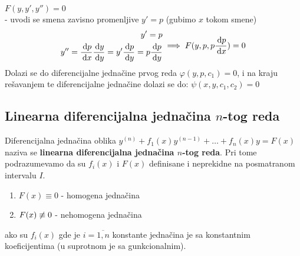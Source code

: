 \begin{enumerate}[label = \textbf{\arabic*. slučaj}]
		$ F(y, y', y'') = 0 $\\
		- uvodi se smena zavisno promenljive $ y' = p $ (gubimo $ x $ tokom smene)\\
		\begin{align*}
		\begin{aligned}
		y' = p\\
		y'' = \frac{\, \mathrm{d} p}{\, \mathrm{d} x} \frac{\, \mathrm{d} y}{\, \mathrm{d} y} = y' \frac{\, \mathrm{d} p}{\, \mathrm{d} y} = p \frac{\, \mathrm{d} p}{\, \mathrm{d} y}\\
		\end{aligned}
		\implies F(y, p, p \frac{\, \mathrm{d} p}{\, \mathrm{d} x}) = 0
		\end{align*}
		Dolazi se do diferencijalne jednačine prvog reda $ \varphi (y, p, c_1) = 0 $, i na kraju rešavanjem te diferencijalne jednačine dolazi se do: $\psi (x, y, c_1, c_2) = 0$
\end{enumerate}

\subsection{Linearna diferencijalna jednačina $n$-tog reda}
\begin{definition}
	Diferencijalna jednačina oblika $y^{(n)} + f_1(x)y^{(n-1)} + \ldots + f_n(x)y = F(x)$ naziva se \textbf{linearna diferencijalna jednačina $n$-tog reda}. Pri tome podrazumevamo da su $f_i(x)$ i $F(x)$ definisane i neprekidne na posmatranom intervalu $I$.
	\begin{enumerate}[label = \arabic*.)]
		\item
			$F(x) \equiv 0$ - homogena jednačina
		\item 
			$F(x) \centernot \equiv 0$ - nehomogena jednačina
	\end{enumerate} 
	\Napomena ako su $f_i(x)$ gde je $i = \overline{1, n}$ konstante jednačina je sa konstantnim koeficijentima (u suprotnom je sa gunkcionalnim).
\end{definition}

